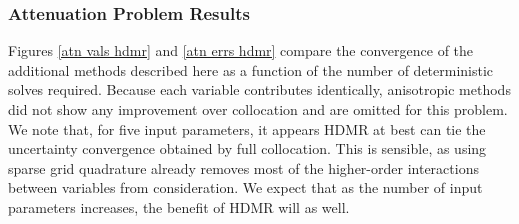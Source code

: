 \documentclass{mc2015}
\begin{document}
\subsubsection{Attenuation Problem Results}
Figures \ref{atn vals hdmr} and \ref{atn errs hdmr} compare the convergence of the additional methods described here as a function of the number of deterministic solves required.  Because each variable contributes identically, anisotropic methods did not show any improvement over collocation and are omitted for this problem.  We note that, for five input parameters, it appears HDMR at best can tie the uncertainty convergence obtained by full collocation.  This is sensible, as using sparse grid quadrature already removes most of the higher-order interactions between variables from consideration.  We expect that as the number of input parameters increases, the benefit of HDMR will as well.
\end{document}
